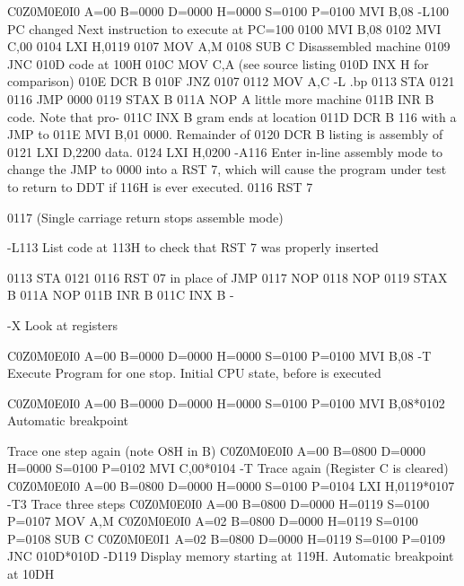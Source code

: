 C0Z0M0E0I0 A=00 B=0000 D=0000 H=0000 S=0100 P=0100 MVI B,08
-L100 
                              PC changed      Next instruction
                                              to execute at PC=100
 0100   MVI        B,08
 0102   MVI        C,00
 0104   LXI        H,0119
 0107   MOV        A,M
 0108   SUB        C          Disassembled machine
 0109   JNC        010D       code at 100H
 010C   MOV        C,A        (see source listing
 010D   INX        H          for comparison)
 010E   DCR        B
 010F   JNZ        0107
 0112   MOV        A,C
-L
.bp
 0113   STA        0121
 0116   JMP        0000
 0119   STAX       B
 011A   NOP                   A little more machine
 011B   INR        B          code.  Note that pro-
 011C   INX        B          gram ends at location
 011D   DCR        B          116 with a JMP to 
 011E   MVI        B,01       0000.  Remainder of
 0120   DCR        B          listing is assembly of
 0121   LXI        D,2200     data.
 0124   LXI        H,0200
-A116  Enter in-line assembly mode to change the JMP to 0000 into a RST 7, 
       which will cause the program under test to return to DDT if 116H is
       ever executed.
0116 RST 7

0117   (Single carriage return stops assemble mode)

-L113   List code at 113H to check that RST 7 was properly inserted

 0113   STA        0121
 0116   RST        07    in place of JMP
 0117   NOP
 0118   NOP
 0119   STAX       B
 011A   NOP
 011B   INR        B
 011C   INX        B
-

-X    Look at registers

C0Z0M0E0I0 A=00 B=0000 D=0000 H=0000 S=0100 P=0100 MVI B,08
-T
   Execute Program for one stop. Initial CPU state, before   is executed

C0Z0M0E0I0 A=00 B=0000 D=0000 H=0000 S=0100 P=0100 MVI B,08*0102
                                       Automatic breakpoint

     Trace one step again (note O8H in B)
C0Z0M0E0I0 A=00 B=0800 D=0000 H=0000 S=0100 P=0102 MVI C,00*0104
-T
     Trace again (Register C is cleared)
C0Z0M0E0I0 A=00 B=0800 D=0000 H=0000 S=0100 P=0104 LXI H,0119*0107
-T3  Trace three steps
C0Z0M0E0I0 A=00 B=0800 D=0000 H=0119 S=0100 P=0107 MOV A,M
C0Z0M0E0I0 A=02 B=0800 D=0000 H=0119 S=0100 P=0108 SUB C
C0Z0M0E0I1 A=02 B=0800 D=0000 H=0119 S=0100 P=0109 JNC 010D*010D
-D119
       Display memory starting at 119H. Automatic breakpoint at 10DH

